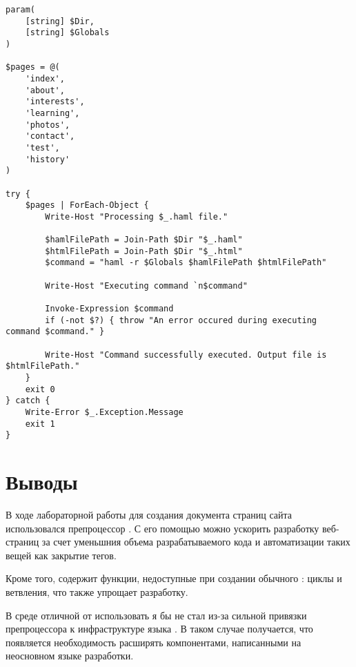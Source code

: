 \documentclass[a4paper,14pt]{extarticle}
\begin{document}
\begin{lstlisting}
param(
    [string] $Dir,
    [string] $Globals
)

$pages = @(
    'index',
    'about',
    'interests',
    'learning',
    'photos',
    'contact',
    'test',
    'history'
)

try {
    $pages | ForEach-Object {
        Write-Host "Processing $_.haml file."

        $hamlFilePath = Join-Path $Dir "$_.haml"
        $htmlFilePath = Join-Path $Dir "$_.html"
        $command = "haml -r $Globals $hamlFilePath $htmlFilePath"
        
        Write-Host "Executing command `n$command"

        Invoke-Expression $command
        if (-not $?) { throw "An error occured during executing command $command." }

        Write-Host "Command successfully executed. Output file is $htmlFilePath."
    }
    exit 0
} catch {
    Write-Error $_.Exception.Message
    exit 1
}
\end{lstlisting}

\section*{Выводы}
В ходе лабораторной работы для создания  документа страниц сайта использовался
препроцессор . С его помощью можно ускорить разработку веб-страниц за счет
уменьшния объема разрабатываемого кода и автоматизации таких вещей как закрытие тегов.

Кроме того,  содержит функции, недоступные при создании обычного :
циклы и ветвления, что также упрощает разработку.

В среде отличной от  использовать  я бы не стал из-за сильной
привязки препроцессора к инфраструктуре языка . В таком случае получается, что
появляется необходимость расширять  компонентами, написанными на неосновном
языке разработки.
\end{document}
